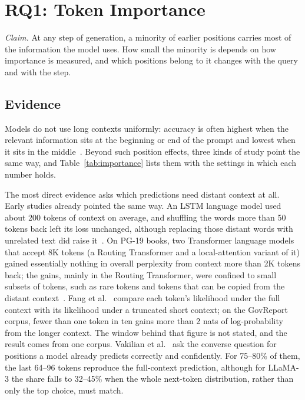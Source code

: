 \documentclass{ieeeaccess}
\begin{document}
\section{RQ1: Token Importance}
\label{sec:importance}

\emph{Claim.} At any step of generation, a minority of earlier positions carries most of the information the model uses. How small the minority is depends on how importance is measured, and which positions belong to it changes with the query and with the step.

\subsection{Evidence}
Models do not use long contexts uniformly: accuracy is often highest when the relevant information sits at the beginning or end of the prompt and lowest when it sits in the middle~\cite{liu2023lost}. Beyond such position effects, three kinds of study point the same way, and Table~\ref{tab:importance} lists them with the settings in which each number holds.

The most direct evidence asks which predictions need distant context at all. Early studies already pointed the same way. An LSTM language model used about 200 tokens of context on average, and shuffling the words more than 50 tokens back left its loss unchanged, although replacing those distant words with unrelated text did raise it~\cite{khandelwal2018sharp}. On PG-19 books, two Transformer language models that accept 8K tokens (a Routing Transformer and a local-attention variant of it) gained essentially nothing in overall perplexity from context more than 2K tokens back; the gains, mainly in the Routing Transformer, were confined to small subsets of tokens, such as rare tokens and tokens that can be copied from the distant context~\cite{sun2021longrange}. Fang et al.~\cite{fang2024what} compare each token's likelihood under the full context with its likelihood under a truncated short context; on the GovReport corpus, fewer than one token in ten gains more than 2 nats of log-probability from the longer context. The window behind that figure is not stated, and the result comes from one corpus. Vakilian et al.~\cite{vakilian2025short} ask the converse question for positions a model already predicts correctly and confidently. For 75--80\% of them, the last 64--96 tokens reproduce the full-context prediction, although for LLaMA-3 the share falls to 32--45\% when the whole next-token distribution, rather than only the top choice, must match.
\end{document}
